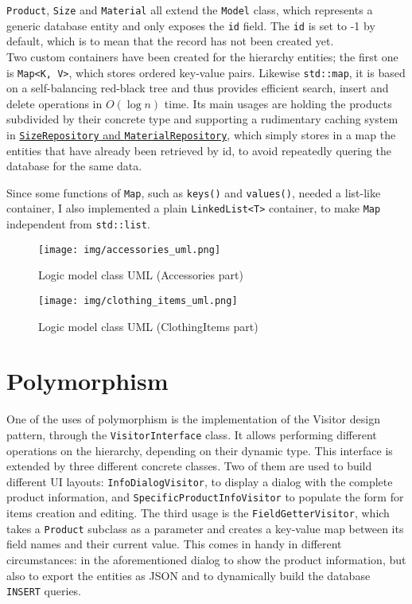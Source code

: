 \documentclass[10pt]{article}
\begin{document}
\texttt{Product},
\texttt{Size} and \texttt{Material} all extend the \texttt{Model} class, which
represents a generic database entity and only exposes the \texttt{id} field.
The \texttt{id} is set to -1 by default, which is to mean that the record has
not been created yet.
\\\linebreak
Two custom containers have been created for the hierarchy entities;
the first one is \texttt{Map<K, V>}, which stores ordered key-value
pairs. Likewise \texttt{std::map}, it is based on a self-balancing red-black
tree and thus provides efficient search, insert and delete operations in $O(\log n)$ time.
Its main usages are holding the products subdivided by their concrete
type and supporting a rudimentary caching system in \hyperref[sec:repositoryPattern]{\texttt{SizeRepository}
    and \texttt{MaterialRepository}}, which simply stores in a map the
entities that have already been retrieved by id, to avoid repeatedly quering
the database for the same data.

Since some functions of \texttt{Map}, such as \texttt{keys()} and
\texttt{values()}, needed a list-like container, I also implemented a plain
\texttt{LinkedList<T>} container, to make \texttt{Map} independent from
\texttt{std::list}.

\begin{figure}
    \centering
    \texttt{[image: img/accessories\_uml.png]}
    \caption{Logic model class UML (Accessories part)}
    \label{fig:accessoriesUML}
\end{figure}
\begin{figure}
    \centering
    \texttt{[image: img/clothing\_items\_uml.png]}
    \caption{Logic model class UML (ClothingItems part)}
    \label{fig:clothingItemsUML}
\end{figure}
\pagebreak

\section{Polymorphism}
One of the uses of polymorphism is the implementation of the Visitor design
pattern, through the \texttt{VisitorInterface} class. It allows performing
different operations on the hierarchy, depending on their dynamic type. This
interface is extended by three different concrete classes. Two of them are used
to build different UI layouts: \texttt{InfoDialogVisitor}, to display a dialog
with the complete product information, and \texttt{SpecificProductInfoVisitor}
to populate the form for items creation and editing. The third usage is the
\texttt{FieldGetterVisitor}, which takes a \texttt{Product} subclass as a
parameter and creates a key-value map between its field names and their current
value. This comes in handy in different circumstances: in the aforementioned
dialog to show the product information, but also to export the entities as JSON
and to dynamically build the database \texttt{INSERT} queries.
\end{document}
